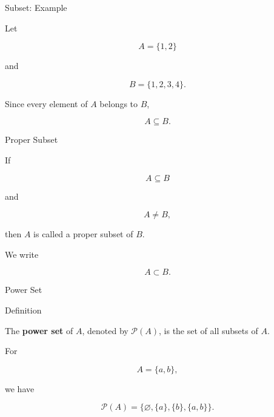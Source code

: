 \documentclass[aspectratio=169,11pt]{beamer}
\begin{document}

\begin{frame}{Subset: Example}

Let

\[
A=\{1,2\}
\]

and

\[
B=\{1,2,3,4\}.
\]

\vspace{0.35cm}

Since every element of $A$ belongs to $B$,

\[
\boxed{A\subseteq B}.
\]

\end{frame}


\begin{frame}{Proper Subset}

If

\[
A\subseteq B
\]

and

\[
A\neq B,
\]

then $A$ is called a \textcolor{MathGreen}{proper subset} of $B$.

\vspace{0.35cm}

We write

\[
\boxed{A\subset B}.
\]

\end{frame}


\begin{frame}{Power Set}

\begin{block}{Definition}

The \textbf{power set} of $A$, denoted by $\mathcal P(A)$,
is the set of all subsets of $A$.

\end{block}

\vspace{0.3cm}

For

\[
A=\{a,b\},
\]

we have

\[
\mathcal P(A)
=
\{
\varnothing,
\{a\},
\{b\},
\{a,b\}
\}.
\]

\end{frame}

\end{document}
